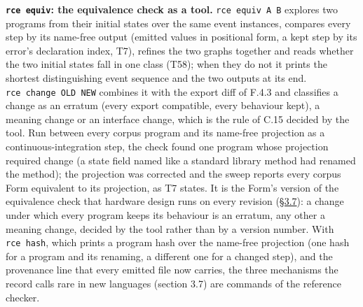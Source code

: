 \documentclass[10pt,letterpaper]{article}
\begin{document}
\textbf{\texttt{rce\ equiv}: the equivalence check as a tool.}
\texttt{rce\ equiv\ A\ B} explores two programs from their initial
states over the same event instances, compares every step by its
name-free output (emitted values in positional form, a kept step by its
error's declaration index, T7), refines the two graphs together and
reads whether the two initial states fall in one class (T58); when they
do not it prints the shortest distinguishing event sequence and the two
outputs at its end. \texttt{rce\ change\ OLD\ NEW} combines it with the
export diff of F.4.3 and classifies a change as an erratum (every export
compatible, every behaviour kept), a meaning change or an interface
change, which is the rule of C.15 decided by the tool. Run between every
corpus program and its name-free projection as a continuous-integration
step, the check found one program whose projection required change (a
state field named like a standard library method had renamed the
method); the projection was corrected and the sweep reports every corpus
Form equivalent to its projection, as T7 states. It is the Form's
version of the equivalence check that hardware design runs on every
revision
(\href{https://research.openie.dev/papers/rce/\#37-the-language-one-text-costs-and-theorem-status}{§3.7}):
a change under which every program keeps its behaviour is an erratum,
any other a meaning change, decided by the tool rather than by a version
number. With \texttt{rce\ hash}, which prints a program hash over the
name-free projection (one hash for a program and its renaming, a
different one for a changed step), and the provenance line that every
emitted file now carries, the three mechanisms the record calls rare in
new languages (section 3.7) are commands of the reference checker.
\end{document}
